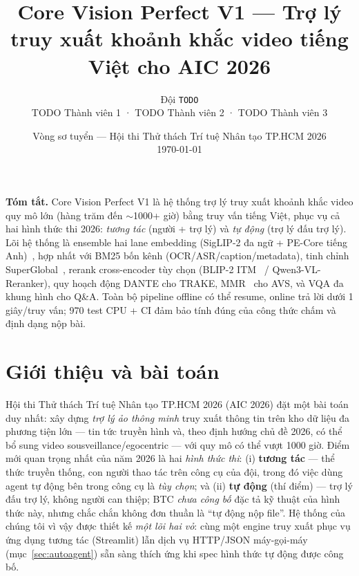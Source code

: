 \documentclass{ai_conquer2026}
\title{Core Vision Perfect V1 --- Trợ lý truy xuất khoảnh khắc video tiếng Việt cho AIC 2026}
\author{%
  Đội \texttt{TODO} \\ \normalsize TODO Thành viên 1 · TODO Thành viên 2 · TODO Thành viên 3
}
\date{Vòng sơ tuyển --- Hội thi Thử thách Trí tuệ Nhân tạo TP.HCM 2026 \\ \normalsize \today}
\begin{document}
\maketitle

\begin{minisummaryboxaivn}
\textbf{Tóm tắt.} Core Vision Perfect V1 là hệ thống trợ lý truy xuất khoảnh khắc
video quy mô lớn (hàng trăm đến $\sim$1000+ giờ) bằng truy vấn tiếng Việt, phục vụ
cả hai hình thức thi 2026: \emph{tương tác} (người + trợ lý) và \emph{tự động}
(trợ lý đấu trợ lý). Lõi hệ thống là ensemble hai lane embedding
(SigLIP-2 đa ngữ + PE-Core tiếng Anh)~\cite{tschannen2025siglip2,bolya2025pe},
hợp nhất với BM25 bốn kênh (OCR/ASR/caption/metadata), tinh chỉnh SuperGlobal~\cite{shao2023superglobal},
rerank cross-encoder tùy chọn (BLIP-2 ITM~\cite{li2023blip2} / Qwen3-VL-Reranker),
quy hoạch động DANTE cho TRAKE, MMR~\cite{carbonell1998mmr} cho AVS, và VQA đa khung hình
cho Q\&A. Toàn bộ pipeline offline có thể resume, online trả lời
dưới 1 giây/truy vấn; 970 test CPU + CI đảm bảo tính đúng của công thức chấm
và định dạng nộp bài. %
\end{minisummaryboxaivn}

\tableofcontents
\newpage

\section{Giới thiệu và bài toán}

Hội thi Thử thách Trí tuệ Nhân tạo TP.HCM 2026 (AIC 2026) đặt một bài toán duy nhất:
xây dựng \emph{trợ lý ảo thông minh} truy xuất thông tin trên kho dữ liệu đa phương tiện
lớn --- tin tức truyền hình và, theo định hướng chủ đề 2026, có thể bổ sung video
sousveillance/egocentric --- với quy mô có thể vượt 1000 giờ. Điểm mới quan trọng nhất
của năm 2026 là hai \emph{hình thức thi}: (i) \textbf{tương tác} --- thể thức truyền thống,
con người thao tác trên công cụ của đội, trong đó việc dùng agent tự động bên trong công cụ
là \emph{tùy chọn}; và (ii) \textbf{tự động} (thí điểm) --- trợ lý đấu trợ lý, không người
can thiệp; BTC \emph{chưa công bố} đặc tả kỹ thuật của hình thức này, nhưng chắc chắn
không đơn thuần là ``tự động nộp file''. Hệ thống của chúng tôi vì vậy được thiết kế
\emph{một lõi hai vỏ}: cùng một engine truy xuất phục vụ ứng dụng tương tác (Streamlit)
lẫn dịch vụ HTTP/JSON máy-gọi-máy (mục~\ref{sec:autoagent}) sẵn sàng thích ứng khi spec
hình thức tự động được công bố.
\end{document}
